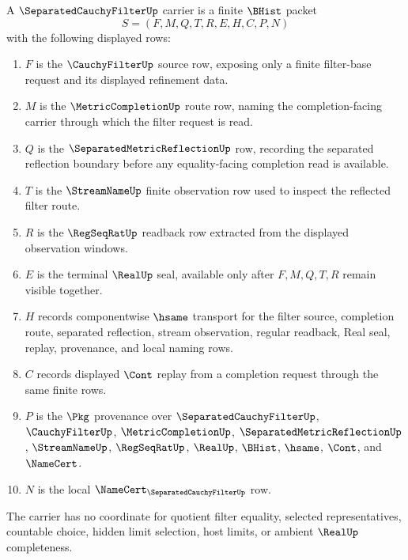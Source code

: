 \begin{definition}
\label{def:separated-cauchy-filter-carrier}
A $\SeparatedCauchyFilterUp$ carrier is a finite $\BHist$ packet
$$
S=(F,M,Q,T,R,E,H,C,P,N)
$$
with the following displayed rows:
\begin{enumerate}
\item $F$ is the $\CauchyFilterUp$ source row, exposing only a finite filter-base request and its displayed refinement data.
\item $M$ is the $\MetricCompletionUp$ route row, naming the completion-facing carrier through which the filter request is read.
\item $Q$ is the $\SeparatedMetricReflectionUp$ row, recording the separated reflection boundary before any equality-facing completion read is available.
\item $T$ is the $\StreamNameUp$ finite observation row used to inspect the reflected filter route.
\item $R$ is the $\RegSeqRatUp$ readback row extracted from the displayed observation windows.
\item $E$ is the terminal $\RealUp$ seal, available only after $F,M,Q,T,R$ remain visible together.
\item $H$ records componentwise $\hsame$ transport for the filter source, completion route, separated reflection, stream observation, regular readback, Real seal, replay, provenance, and local naming rows.
\item $C$ records displayed $\Cont$ replay from a completion request through the same finite rows.
\item $P$ is the $\Pkg$ provenance over $\SeparatedCauchyFilterUp$, $\CauchyFilterUp$, $\MetricCompletionUp$, $\SeparatedMetricReflectionUp$, $\StreamNameUp$, $\RegSeqRatUp$, $\RealUp$, $\BHist$, $\hsame$, $\Cont$, and $\NameCert$.
\item $N$ is the local $\NameCert_{\SeparatedCauchyFilterUp}$ row.
\end{enumerate}
The carrier has no coordinate for quotient filter equality, selected representatives, countable choice, hidden limit selection, host limits, or ambient $\RealUp$ completeness.
\end{definition}

